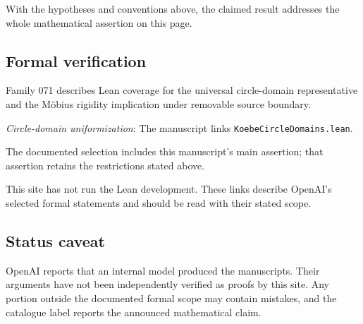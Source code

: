 \documentclass[11pt]{article}
\begin{document}
With the hypotheses and conventions above, the claimed result addresses the whole mathematical assertion on this page.

\subsection{Formal verification}
Family 071 describes Lean coverage for the universal circle-domain representative and the Möbius rigidity implication under removable source boundary.

\textit{Circle-domain uniformization}: The manuscript links \texttt{KoebeCircleDomains.lean}.

The documented selection includes this manuscript’s main assertion; that assertion retains the restrictions stated above.

This site has not run the Lean development. These links describe OpenAI’s selected formal statements and should be read with their stated scope.

\subsection{Status caveat}
OpenAI reports that an internal model produced the manuscripts. Their arguments have not been independently verified as proofs by this site. Any portion outside the documented formal scope may contain mistakes, and the catalogue label reports the announced mathematical claim.
\end{document}
